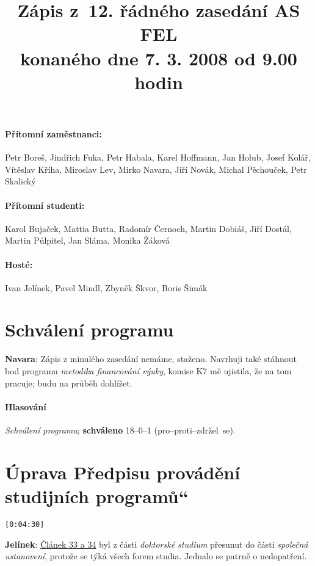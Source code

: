 \documentclass[a4paper,10pt,notitlepage]{article}
\title{\textbf{Zápis z~12. řádného zasedání AS FEL}\\konaného dne 7. 3. 2008 od 9.00 hodin}
\author{}\date{}
\newcommand{\ts}[1]{\texttt{[#1]}}
\newcommand{\cl}[1]{\noindent \textbf{#1}:}
\newcommand{\hlprvni}[3]{\paragraph{Hlasování} \textit{#1}; \textbf{#3}
#2 (pro--proti--zdržel~se).}
\newcommand{\tourl}[1]{http://www.fel.cvut.cz/senat/zapisy/#1}
\newcommand\uv[1]{\quotedblbase #1\textquotedblleft}%
\begin{document}
\maketitle

\paragraph{Přítomní zaměstnanci:} Petr Boreš, Jindřich Fuka, Petr Habala, Karel Hoffmann, Jan Holub, Josef Kolář, Vítěslav Kříha, Miroslav Lev, Mirko Navara, Jiří Novák, Michal Pěchouček, Petr Skalický

\paragraph{Přítomní studenti:} Karol Bujaček, Mattia Butta, Radomír Černoch, Martin Dobiáš, Jiří Dostál, Martin Půlpitel, Jan Sláma, Monika Žáková

\paragraph{Hosté:} Ivan Jelínek, Pavel Mindl, Zbyněk Škvor, Boris Šimák

\section{Schválení programu}

\cl{Navara} Zápis z minulého zasedání nemáme, staženo. Navrhuji také stáhnout bod programu \textit{metodika financování výuky}, komise K7 mě ujistila, že na tom pracuje; budu na průběh dohlížet.

\hlprvni{Schválení programu}{18--0--1}{schváleno}


\section{Úprava \uv{Předpisu provádění studijních programů}}

\ts{0:04:30}

\cl{Jelínek} \href{\tourl{zapis12-predpis-stud-delta33-34.doc}}{Článek 33 a 34} byl z části \textit{doktorské studium} přesunut do části \textit{společná ustanovení}, protože se týká všech forem studia. Jednalo se patrně o nedopatření.
\end{document}
